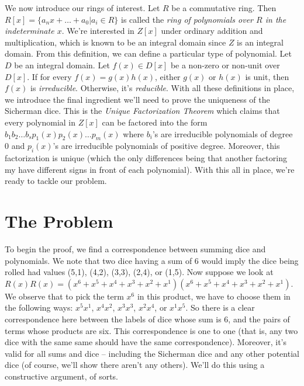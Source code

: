 \documentclass[12pt]{report}
\begin{document}
We now introduce our rings of interest. Let $R$ be a commutative ring. Then $R[x]=\{ a_{n}x + \ldots + a_{0} | a_{i}\in R\}$ is called the \textit{ring of polynomials over $R$ in the indeterminate $x$}. We're interested in $Z[x]$ under ordinary addition and multiplication, which is known to be an integral domain since $Z$ is an integral domain. From this definition, we can define a particular type of polynomial. Let $D$ be an integral domain. Let $f(x)\in D[x]$ be a non-zero or non-unit over $D[x]$. If for every $f(x)=g(x)h(x)$, either $g(x)$ or $h(x)$ is unit, then $f(x)$ is \textit{irreducible}. Otherwise, it's \textit{reducible}. With all these definitions in place, we introduce the final ingredient we'll need to prove the uniqueness of the Sicherman dice. This is the \textit{Unique Factorization Theorem} which claims that every polynomial in $Z[x]$ can be factored into the form $b_{1}b_{2}\ldots b_{s}p_{1}(x)p_{2}(x)\ldots p_{m}(x)$ where $b_{i}$'s are irreducible polynomials of degree $0$ and $p_{i}(x)$'s are irreducible polynomials of positive degree. Moreover, this factorization is unique (which the only differences being that another factoring my have different signs in front of each polynomial). With this all in place, we're ready to tackle our problem.

\section*{The Problem}
To begin the proof, we find a correspondence between summing dice and polynomials. We note that two dice having a sum of 6 would imply the dice being rolled had values (5,1), (4,2), (3,3), (2,4), or (1,5). Now suppose we look at $R(x)R(x)=(x^{6}+x^{5}+x^{4}+x^{3}+x^{2}+x^{1})(x^{6}+x^{5}+x^{4}+x^{3}+x^{2}+x^{1})$. We observe that to pick the term $x^{6}$ in this product, we have to choose them in the following ways: $x^{5}x^{1}$, $x^{4}x^{2}$, $x^{3}x^{3}$, $x^{2}x^{4}$, or $x^{1}x^{5}$. So there is a clear correspondence here between the labels of dice whose sum is 6, and the pairs of terms whose products are six. This correspondence is one to one (that is, any two dice with the same same should have the same correspondence). Moreover, it's valid for all sums and dice -- including the Sicherman dice and any other potential dice (of course, we'll show there aren't any others). We'll do this using a constructive argument, of sorts.
\end{document}
